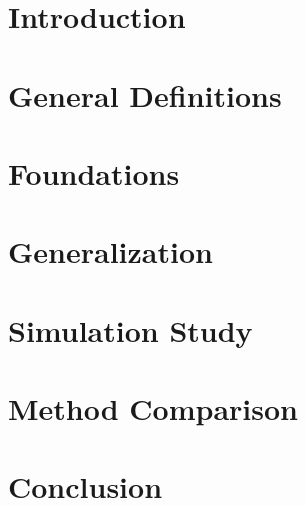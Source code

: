 \documentclass[12pt]{article}
\begin{document}
\newpage
\tableofcontents

\newpage


    
\section{Introduction}
\label{intro}

\newpage

\section{General Definitions}
\label{general_definitions}

\newpage
\section{Foundations}
\label{foundations}

\newpage
\section{Generalization}
\label{generalization}

\newpage
\section{Simulation Study}

\label{simulation_study}
\newpage
\section{Method Comparison}
\label{iml_methods_comparison}


\section{Conclusion}
\label{conclusion}


\newpage

    
\end{document}
